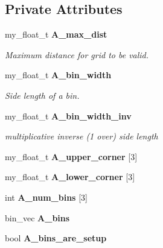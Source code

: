 \subsection*{Private Attributes}
\begin{CompactItemize}
\item 
my\_\-float\_\-t \bf{A\_\-max\_\-dist}\label{classASCbase_1_1geometry_1_1FaceBins_0481f2a87485d01a65aab4f8b687efca}

\begin{CompactList}\small\item\em Maximum distance for grid to be valid. \item\end{CompactList}\item 
my\_\-float\_\-t \bf{A\_\-bin\_\-width}\label{classASCbase_1_1geometry_1_1FaceBins_c3aa84da4207c9573aaef792e2988134}

\begin{CompactList}\small\item\em Side length of a bin. \item\end{CompactList}\item 
my\_\-float\_\-t \bf{A\_\-bin\_\-width\_\-inv}\label{classASCbase_1_1geometry_1_1FaceBins_4e1b856ab3efe9b683ed2a614be70271}

\begin{CompactList}\small\item\em multiplicative inverse (1 over) side length \item\end{CompactList}\item 
my\_\-float\_\-t \textbf{A\_\-upper\_\-corner} [3]\label{classASCbase_1_1geometry_1_1FaceBins_6858beab5909ad54778a973fa8079ad4}

\item 
my\_\-float\_\-t \textbf{A\_\-lower\_\-corner} [3]\label{classASCbase_1_1geometry_1_1FaceBins_5f44b49a5e0e0429df1d46ee850f40fc}

\item 
int \textbf{A\_\-num\_\-bins} [3]\label{classASCbase_1_1geometry_1_1FaceBins_71718aed789247b496f94743d98be593}

\item 
bin\_\-vec \textbf{A\_\-bins}\label{classASCbase_1_1geometry_1_1FaceBins_4155b182937c0d808db7b4719be36c29}

\item 
bool \textbf{A\_\-bins\_\-are\_\-setup}\label{classASCbase_1_1geometry_1_1FaceBins_8cd2197a8b71449917ef608aa8bedd11}

\end{CompactItemize}


